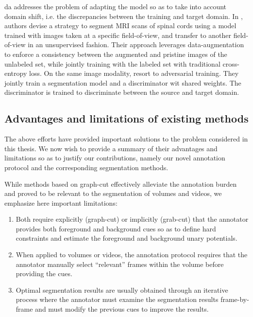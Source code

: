 \gls{da} addresses the problem of adapting the model so as to take into account domain shift, i.e. the discrepancies between the training and target domain.
In \cite{perone19}, authors devise a strategy to segment MRI scans of spinal cords
using a model trained with images taken at a specific field-of-view, and transfer
to another field-of-view in an unsupervised fashion.
Their approach leverages data-augmentation to enforce a consistency between
the augmented and pristine images of the unlabeled set, while jointly training
with the labeled set with traditional cross-entropy loss.
On the same image modality, \cite{li20} resort to adversarial training. They
jointly train a segmentation model and a discriminator wit shared weights.
The discriminator is trained to discriminate between the source and target domain.

\subsection{Advantages and limitations of existing methods}

The above efforts have provided important solutions to the problem considered in this thesis.
We now wish to provide a summary of their advantages and limitations so as to
justify our contributions, namely our novel annotation protocol and the corresponding
segmentation methods.

While methods based on graph-cut effectively alleviate the annotation burden and proved to be relevant
to the segmentation of volumes and videos, we emphasize here important limitations:

\begin{enumerate}
  \item Both require explicitly (graph-cut) or implicitly (grab-cut) that the annotator provides both
    foreground and background cues so as to define hard constraints and estimate the foreground
    and background unary potentials.
  \item When applied to volumes or videos, the annotation protocol requires that the annotator
    manually select ``relevant'' frames within the volume before providing the cues.
  \item Optimal segmentation results are usually obtained through an iterative process where the annotator
    must examine the segmentation results frame-by-frame and must modify the previous cues to improve the results.
\end{enumerate}




